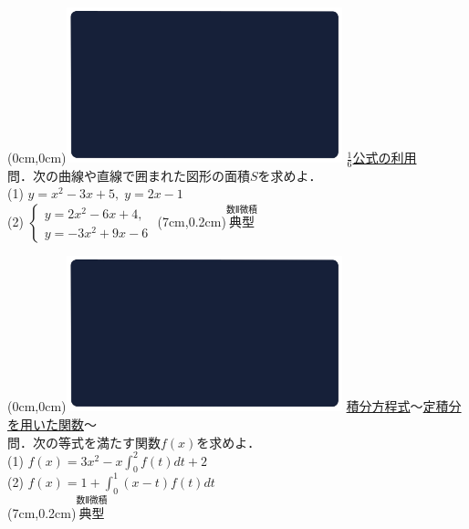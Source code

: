 \documentclass[10pt,
fleqn,
dvipdfmx,
uplatex
]{jsarticle}
\begin{document}
\newpage



\at(0cm,0cm){\includegraphics[width=8cm,bb=0 0 1920 1080]{./media_local/smart_background/数II微積.jpeg}}
{\color{orange}\Large\underline{$\frac{1}{6}$公式の利用}}\vspace{0.3zw}\\
\large 
 問．次の曲線や直線で囲まれた図形の面積$S$を求めよ．\\
(1)  $y=x^2-3x+5,\;y=2x-1$\\
(2)  $\left\{\begin{array}{l}y=2x^2-6x+4,\;\\y=-3x^2+9x-6\end{array}\right.$
\at(7cm,0.2cm){\small\color{bradorange}$\overset{\text{数Ⅱ微積}}{\text{典型}}$}


\newpage



\at(0cm,0cm){\includegraphics[width=8cm,bb=0 0 1920 1080]{./media_local/smart_background/数II微積.jpeg}}
{\color{orange}\large\underline{積分方程式$〜$定積分を用いた関数$〜$}}\vspace{0.3zw}\\
\large 
 問．次の等式を満たす関数$f\left(x\right)$を求めよ．\\
(1)  $f\left(x\right)=3x^2-x\displaystyle\int_0^2f\left(t\right)dt+2$\\
(2)  $f\left(x\right)=1+\displaystyle\int_0^1\left(x-t\right)f\left(t\right)dt$\\
\at(7cm,0.2cm){\small\color{bradorange}$\overset{\text{数Ⅱ微積}}{\text{典型}}$}

\newpage
\end{document}
